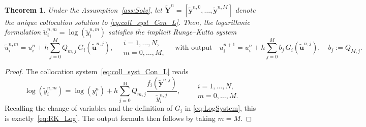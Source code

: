 \documentclass[a4paper,num-refs]{oup-contemporary-spidec}
\newtheorem{theorem}{Theorem}[section]
\begin{document}
\begin{theorem}\label{prop:RK_Log}
    Under the Assumption~\ref{ass:Solv}, let $\tilde{\bm{Y}}^n=[\tilde{\bm{y}}^{n,0},\dots,\tilde{\bm{y}}^{n,M}]$ denote the unique collocation solution to \eqref{eq:coll_syst_Con_L}. Then, the logarithmic formulation $\tilde{u}_i^{n,m} = \log(\tilde{y}_i^{n,m})$ satisfies the implicit Runge--Kutta system
    \begin{equation}\label{eq:RK_Log}
        \tilde{u}_i^{n,m}=  u_i^n + h\sum_{j=0}^M Q_{m,j}\,G_i\!\left(\tilde{\bm{u}}^{n,j}\right), \quad \begin{array}{l}
             i=1,\dots,N,  \\
             m=0,\dots,M, 
        \end{array} \quad \text{with output} \quad u_i^{n+1} = u_i^n + h\sum_{j=0}^M b_j\, G_i\!\left(\tilde{\bm{u}}^{n,j}\right), \quad b_j := Q_{M,j}.
    \end{equation}
\end{theorem}
\begin{proof}
    The collocation system~\eqref{eq:coll_syst_Con_L} reads
    \begin{equation*}
        \log(\tilde{y}_i^{n,m})= \log(y_i^n)+ h\sum_{j=0}^M Q_{m,j}\frac{f_i(\tilde{\bm{y}}^{n,j})}{\tilde{y}_i^{n,j}},
        \qquad \begin{array}{l}
             i=1,\dots,N,  \\
             m=0,\dots,M. 
        \end{array}
    \end{equation*}
    Recalling the change of variables and the definition of $G_i$ in \eqref{eq:LogSystem}, this is exactly~\eqref{eq:RK_Log}. The output formula then follows by taking $m=M.$
\end{proof}
\end{document}
